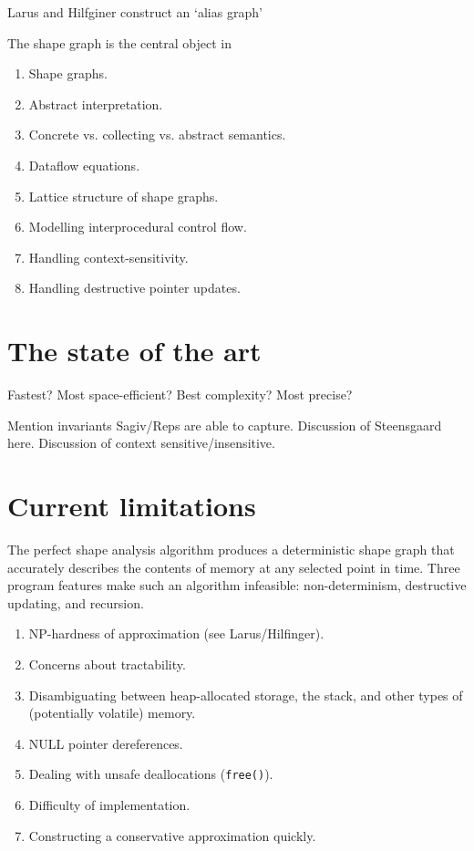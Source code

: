 \documentclass{article}
\begin{document}
    Larus and Hilfginer construct an `alias graph'

The shape graph is the central object in 

\begin{enumerate}[1.]
    \item Shape graphs.
    \item Abstract interpretation.
    \item Concrete vs. collecting vs. abstract semantics.
    \item Dataflow equations.
    \item Lattice structure of shape graphs.
    \item Modelling interprocedural control flow.
    \item Handling context-sensitivity.
    \item Handling destructive pointer updates.
\end{enumerate}

\section{The state of the art}

Fastest?
Most space-efficient?
Best complexity?
Most precise?

Mention invariants Sagiv/Reps are able to capture.
Discussion of Steensgaard here.
Discussion of context sensitive/insensitive.

\section{Current limitations}

The perfect shape analysis algorithm produces a deterministic shape graph
that accurately describes the contents of memory at any selected point in
time. Three program features make such an algorithm infeasible:
non-determinism, destructive updating, and recursion. 

\begin{enumerate}[1.]
    \item NP-hardness of approximation (see Larus/Hilfinger).
    \item Concerns about tractability.
    \item Disambiguating between heap-allocated storage, the stack, and
        other types of (potentially volatile) memory.
    \item NULL pointer dereferences.
    \item Dealing with unsafe deallocations (\texttt{free()}).
    \item Difficulty of implementation.
    \item Constructing a conservative approximation quickly.
\end{enumerate}
\end{document}
